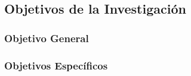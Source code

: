 \subsection{Objetivos de la Investigación}
\subsubsection{Objetivo General}
%
\subsubsection{Objetivos Específicos}
%

%

%
